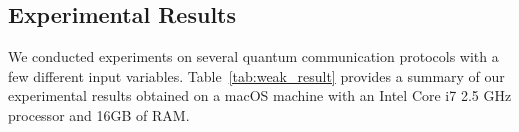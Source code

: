 \documentclass[a4paper,runningheads]{llncs}
\begin{document}

\subsection{Experimental Results}\label{sec:exper}
We conducted experiments on several quantum communication protocols with a few different input variables.  
Table~\ref{tab:weak_result} provides a summary of our experimental results obtained on a macOS machine with an Intel Core i7 2.5 GHz processor and 16GB of RAM.
\end{document}
